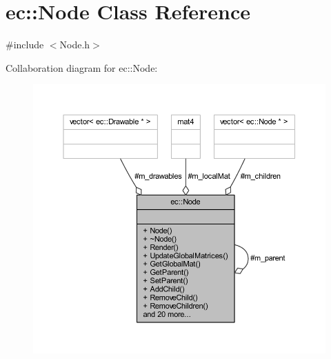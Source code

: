 \hypertarget{classec_1_1_node}{}\section{ec\+:\+:Node Class Reference}
\label{classec_1_1_node}


{\ttfamily \#include $<$Node.\+h$>$}



Collaboration diagram for ec\+:\+:Node\+:
\nopagebreak
\begin{figure}[H]
\begin{center}
\leavevmode
\includegraphics[width=350pt]{classec_1_1_node__coll__graph}
\end{center}
\end{figure}
